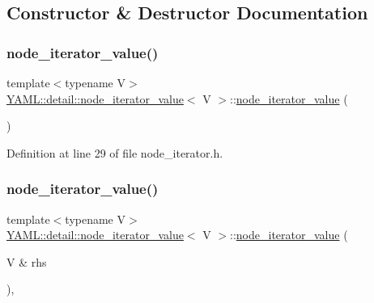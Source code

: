 \subsection{Constructor \& Destructor Documentation}
\mbox{\label{struct_y_a_m_l_1_1detail_1_1node__iterator__value_ac7dd7c3c759474ade81bce5f08318e77}} 
\subsubsection{\texorpdfstring{node\_iterator\_value()}{node\_iterator\_value()}\hspace{0.1cm}{\footnotesize\ttfamily [1/3]}}
{\footnotesize\ttfamily template$<$typename V$>$ \\
\mbox{\hyperlink{struct_y_a_m_l_1_1detail_1_1node__iterator__value}{Y\+A\+M\+L\+::detail\+::node\+\_\+iterator\+\_\+value}}$<$ V $>$\+::\mbox{\hyperlink{struct_y_a_m_l_1_1detail_1_1node__iterator__value}{node\+\_\+iterator\+\_\+value}} (\begin{DoxyParamCaption}{ }\end{DoxyParamCaption})\hspace{0.3cm}{\ttfamily [inline]}}



Definition at line 29 of file node\+\_\+iterator.\+h.

\mbox{\label{struct_y_a_m_l_1_1detail_1_1node__iterator__value_addbc26fb7d041b89c4191aece5163282}} 
\subsubsection{\texorpdfstring{node\_iterator\_value()}{node\_iterator\_value()}\hspace{0.1cm}{\footnotesize\ttfamily [2/3]}}
{\footnotesize\ttfamily template$<$typename V$>$ \\
\mbox{\hyperlink{struct_y_a_m_l_1_1detail_1_1node__iterator__value}{Y\+A\+M\+L\+::detail\+::node\+\_\+iterator\+\_\+value}}$<$ V $>$\+::\mbox{\hyperlink{struct_y_a_m_l_1_1detail_1_1node__iterator__value}{node\+\_\+iterator\+\_\+value}} (\begin{DoxyParamCaption}\item[{V \&}]{rhs }\end{DoxyParamCaption})\hspace{0.3cm}{\ttfamily [inline]}, {\ttfamily [explicit]}}



